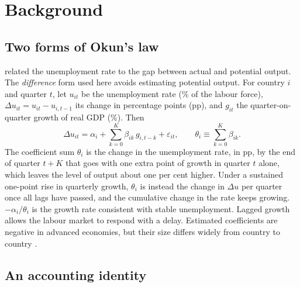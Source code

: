 \section{Background}\label{sec:background}

\subsection{Two forms of Okun's law}

\citet{okun1962} related the unemployment rate to the gap between actual and potential
output. The \emph{difference} form used here avoids estimating potential output. For
country $i$ and quarter $t$, let $u_{it}$ be the unemployment rate (\% of the labour force),
$\Delta u_{it}=u_{it}-u_{i,t-1}$ its change in percentage points (pp), and $g_{it}$ the
quarter-on-quarter growth of real GDP (\%). Then
\begin{equation}\label{eq:okun}
  \Delta u_{it} = \alpha_i + \sum_{k=0}^{K}\beta_{ik}\, g_{i,t-k} + \varepsilon_{it},
  \qquad \theta_i \equiv \sum_{k=0}^{K}\beta_{ik}.
\end{equation}
The coefficient sum $\theta_i$ is the change in the unemployment rate, in pp, by the end of
quarter $t+K$ that goes with one extra point of growth in quarter $t$ alone, which leaves
the level of output about one per cent higher. Under a sustained one-point rise in quarterly
growth, $\theta_i$ is instead the change in $\Delta u$ per quarter once all lags have
passed, and the cumulative change in the rate keeps growing. $-\alpha_i/\theta_i$ is the
growth rate
consistent with stable unemployment. Lagged growth allows the labour market to respond with
a delay. Estimated coefficients are negative in advanced economies, but their size
differs widely from country to country \citep{ball2017okun}.

\subsection{An accounting identity}


